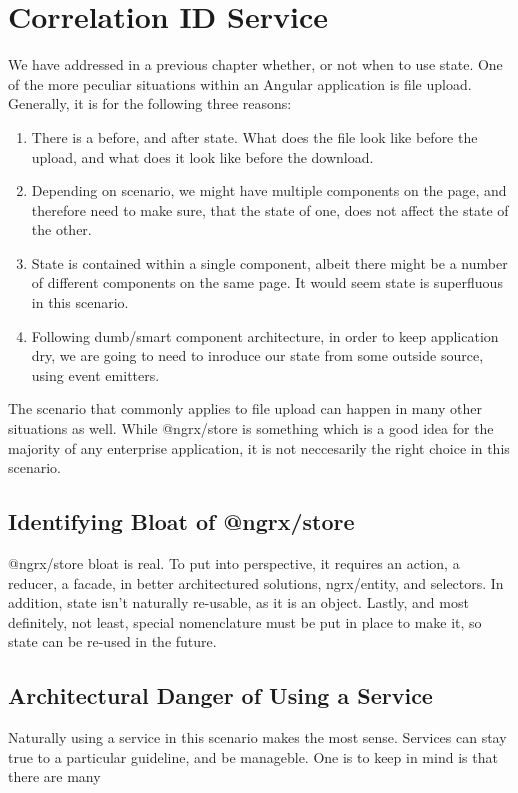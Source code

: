 \section{ Correlation ID Service }
\maketitle{}

We have addressed in a previous chapter whether, or not when to use state. One
of the more peculiar situations within an Angular application is file upload.
Generally, it is for the following three reasons:
\begin{enumerate}
  \item There is a before, and after state. What does the file look like before
  the upload, and what does it look like before the download.
  \item Depending on scenario, we might have multiple components on the page,
  and therefore need to make sure, that the state of one, does not affect the
  state of the other.
  \item State is contained within a single component, albeit there might be a
  number of different components on the same page. It would seem state is
  superfluous in this scenario.
  \item Following dumb/smart component architecture, in order to keep
  application dry, we are going to need to inroduce our state from some outside
  source, using event emitters.
\end{enumerate}

The scenario that commonly applies to file upload can happen in many other
situations as well. While @ngrx/store is something which is a good idea for the
majority of any enterprise application, it is not neccesarily the right choice
in this scenario.

\subsection{Identifying Bloat of @ngrx/store}
@ngrx/store bloat is real. To put into perspective, it requires an action, a
reducer, a facade, in better architectured solutions, ngrx/entity, and
selectors. In addition, state isn't naturally re-usable, as it is an object.
Lastly, and most definitely, not least, special nomenclature must be put in
place to make it, so state can be re-used in the future.

\subsection{Architectural Danger of Using a Service}
Naturally using a service in this scenario makes the most sense. Services can
stay true to a particular guideline, and be manageble. One is to keep in mind
is that there are many
